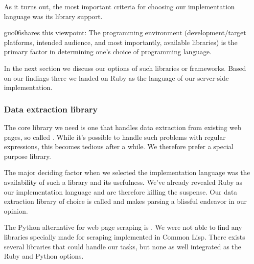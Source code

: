 As it turns out, the most important criteria for choosing our implementation
language was its library support.

\begin{fullquote}{guo06}{shares this viewpoint:}
  The programming environment (development/target platforms, intended
  audience, and most importantly, available libraries) is the primary factor
  in determining one's choice of programming language.
\end{fullquote}

In the next section we discuss our options
of such libraries or frameworks. Based on our findings there we landed on
Ruby as the language of our server-side implementation.

\subsubsection{Data extraction library}

The core library we need is one that handles data extraction from existing
web pages, so called  . While it's possible to
handle such problems with regular expressions, this becomes tedious after a
while. We therefore prefer a special purpose library.

The major deciding factor when we selected the implementation language was
the availability of such a library and its usefulness. We've already
revealed Ruby as our implementation language and are therefore killing the
suspense. Our data extraction library of choice is called %
and makes  parsing a blissful endeavor in our opinion.

The Python alternative for web page scraping is .
We were not able to find any libraries specially made for  scraping
implemented in Common Lisp. There exists several %
libraries that could handle our tasks, but none as well integrated as
the Ruby and Python options.

